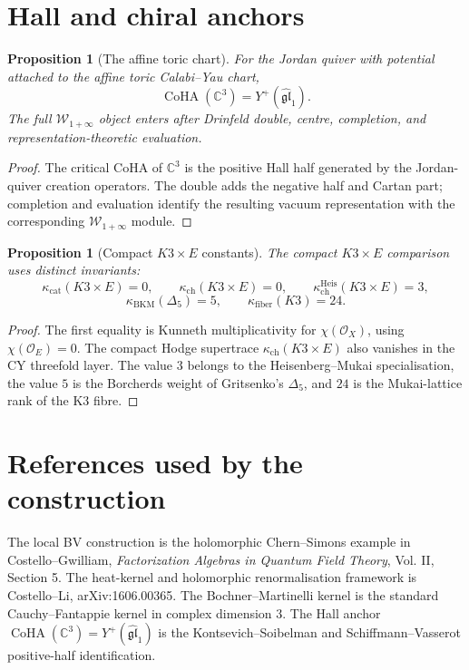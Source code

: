 \documentclass[11pt]{amsart}
\providecommand{\C}{\mathbb{C}}
\providecommand{\CoHA}{\operatorname{CoHA}}
\providecommand{\kcat}{\kappa_{\mathrm{cat}}}
\providecommand{\kch}{\kappa_{\mathrm{ch}}}
\providecommand{\kBKM}{\kappa_{\mathrm{BKM}}}
\providecommand{\kfib}{\kappa_{\mathrm{fiber}}}
\theoremstyle{plain}
\newtheorem{proposition}[theorem]{Proposition}
\theoremstyle{definition}
\theoremstyle{remark}
\begin{document}
\section{Hall and chiral anchors}

\begin{proposition}[The affine toric chart]
For the Jordan quiver with potential attached to the affine toric
Calabi--Yau chart,
\[
  \CoHA(\C^3)=Y^+(\widehat{\mathfrak{gl}}_1).
\]
The full \(\mathcal W_{1+\infty}\) object enters after Drinfeld double,
centre, completion, and representation-theoretic evaluation.
\end{proposition}

\begin{proof}
The critical CoHA of \(\C^3\) is the positive Hall half generated by
the Jordan-quiver creation operators. The double adds the negative
half and Cartan part; completion and evaluation identify the resulting
vacuum representation with the corresponding
\(\mathcal W_{1+\infty}\) module.
\end{proof}

\begin{proposition}[Compact \texorpdfstring{$K3\times E$}{K3 x E} constants]
The compact \(K3\times E\) comparison uses distinct invariants:
\[
  \kcat(K3\times E)=0,\qquad
  \kch(K3\times E)=0,\qquad
  \kch^{\mathrm{Heis}}(K3\times E)=3,
\]
\[
  \kBKM(\Delta_5)=5,\qquad
  \kfib(K3)=24.
\]
\end{proposition}

\begin{proof}
The first equality is Kunneth multiplicativity for
\(\chi(\mathcal O_X)\), using \(\chi(\mathcal O_E)=0\). The compact
Hodge supertrace \(\kch(K3\times E)\) also vanishes in the CY threefold
layer. The value \(3\) belongs to the Heisenberg--Mukai specialisation,
the value \(5\) is the Borcherds weight of Gritsenko's \(\Delta_5\),
and \(24\) is the Mukai-lattice rank of the K3 fibre.
\end{proof}

\section{References used by the construction}

The local BV construction is the holomorphic Chern--Simons example in
Costello--Gwilliam, \emph{Factorization Algebras in Quantum Field
Theory}, Vol. II, Section 5. The heat-kernel and holomorphic
renormalisation framework is Costello--Li, arXiv:1606.00365. The
Bochner--Martinelli kernel is the standard Cauchy--Fantappie kernel in
complex dimension \(3\). The Hall anchor
\(\CoHA(\C^3)=Y^+(\widehat{\mathfrak{gl}}_1)\) is the
Kontsevich--Soibelman and Schiffmann--Vasserot positive-half
identification.
\end{document}
